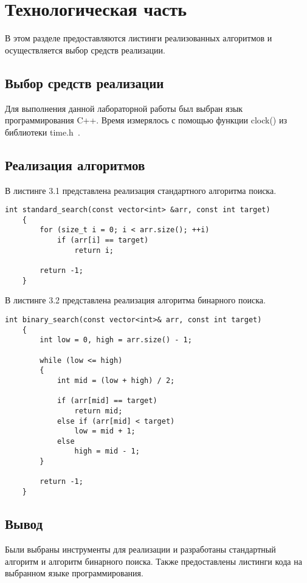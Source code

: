 \chapter{Технологическая часть}

В этом разделе предоставляются листинги реализованных алгоритмов и
осуществляется выбор средств реализации.

\section{Выбор средств реализации}

Для выполнения данной лабораторной работы был выбран язык программирования C++. 
Время измерялось с помощью функции clock() из библиотеки time.h~\cite{clock_t}.

\section{Реализация алгоритмов}

В листинге 3.1 представлена реализация стандартного алгоритма поиска.

\begin{lstlisting}[caption=Стандартный алгоритм поиска]
	int standard_search(const vector<int> &arr, const int target) 
	{
		for (size_t i = 0; i < arr.size(); ++i)
			if (arr[i] == target)
				return i;
		
		return -1;
	}
\end{lstlisting}

\clearpage

В листинге 3.2 представлена реализация алгоритма бинарного поиска.

\begin{lstlisting}[caption=Алгоритм бинарного поиска]
	int binary_search(const vector<int>& arr, const int target) 
	{
		int low = 0, high = arr.size() - 1;
		
		while (low <= high) 
		{
			int mid = (low + high) / 2;
			
			if (arr[mid] == target)
				return mid;
			else if (arr[mid] < target)
				low = mid + 1;
			else
				high = mid - 1;
		}
		
		return -1;
	}
\end{lstlisting}

\section*{Вывод}

Были выбраны инструменты для реализации и разработаны стандартный алгоритм и алгоритм бинарного поиска.
Также предоставлены листинги кода на выбранном языке программирования.